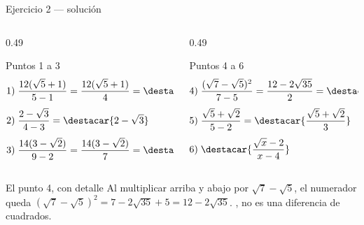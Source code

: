 \documentclass[aspectratio=169,10pt]{beamer}
\begin{document}
\begin{frame}{Ejercicio 2 — solución}
  \tiny
  \begin{columns}[T,onlytextwidth]
    \begin{column}{0.49\textwidth}
      \begin{block}{Puntos 1 a 3}
        \tiny
        \begin{align*}
          1)\;& \frac{12(\sqrt5+1)}{5-1} = \frac{12(\sqrt5+1)}{4}
                = \destacar{3\sqrt{5}+3} \\[0.3em]
          2)\;& \frac{2-\sqrt3}{4-3} = \destacar{2-\sqrt{3}} \\[0.3em]
          3)\;& \frac{14(3-\sqrt2)}{9-2} = \frac{14(3-\sqrt2)}{7}
                = \destacar{6-2\sqrt{2}}
        \end{align*}
      \end{block}
    \end{column}
    \begin{column}{0.49\textwidth}
      \begin{block}{Puntos 4 a 6}
        \tiny
        \begin{align*}
          4)\;& \frac{(\sqrt7-\sqrt5)^{2}}{7-5}
                = \frac{12-2\sqrt{35}}{2} = \destacar{6-\sqrt{35}} \\[0.3em]
          5)\;& \frac{\sqrt5+\sqrt2}{5-2}
                = \destacar{\frac{\sqrt{5}+\sqrt{2}}{3}} \\[0.3em]
          6)\;& \destacar{\frac{\sqrt{x}-2}{x-4}}
        \end{align*}
      \end{block}
    \end{column}
  \end{columns}

  \vspace{0.08cm}
  \begin{alertblock}{El punto 4, con detalle}
    \tiny
    Al multiplicar arriba y abajo por $\sqrt7-\sqrt5$, el numerador queda
    $(\sqrt7-\sqrt5)^2 = 7 - 2\sqrt{35} + 5 = 12-2\sqrt{35}$. , no es una diferencia de
    cuadrados. 
  \end{alertblock}
\end{frame}
\end{document}
